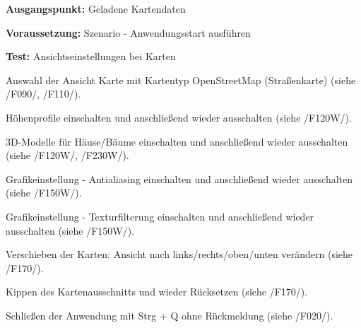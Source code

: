 \documentclass[10pt]{scrreprt}
\newcommand{\sfbf}[1]{\textbf{\sffamily #1}}
\newcommand{\ziel}[1]{{\fontsize{9.5}{11}\textsf{/#1/}}}
\newcommand{\ziellabel}{Z}
\newcommand{\muss}{\renewcommand{\labelenumi}{\textbf{\ziel{\ziellabel\numprint{\theenumi}0}}}}
\newcommand{\wunsch}{\renewcommand{\labelenumi}{\textbf{\ziel{\ziellabel\numprint{\theenumi}0W}}}}
\newenvironment{details}[1][6pt]{%
  \parskip#1 \parindent6mm \raggedright%
  \def\item{\par\ignorespaces\hangindent=5mm \hangafter1}}{%
  \par\ignorespaces}
\begin{document}
\vspace{1.0cm}
\begin{details}[2pt]
\item \sfbf{Ausgangspunkt:} Geladene Kartendaten 
\item \sfbf{Voraussetzung:} Szenario - Anwendungsstart ausführen
\item \sfbf{Test:} Ansichtseinstellungen bei Karten
\end{details}
\begin{enumerate}[leftmargin = 2.2cm, resume]
\item Auswahl der Ansicht Karte mit Kartentyp OpenStreetMap (Straßenkarte) (siehe \ziel{F090}, \ziel{F110}).
\wunsch
\item Höhenprofile einschalten und anschließend wieder ausschalten (siehe \ziel{F120W}).
\item 3D-Modelle für Häuse/Bäume einschalten und anschließend wieder ausschalten (siehe \ziel{F120W}, \ziel{F230W}).
\item Grafikeinstellung - Antialiasing einschalten und anschließend wieder ausschalten (siehe \ziel{F150W}).
\item Grafikeinstellung - Texturfilterung einschalten und anschließend wieder ausschalten (siehe \ziel{F150W}).
\muss
\item Verschieben der Karten: Ansicht nach links/rechts/oben/unten verändern (siehe \ziel{F170}).
\item Kippen des Kartenausschnitts und wieder Rücksetzen (siehe \ziel{F170}).
\item Schließen der Anwendung mit Strg + Q ohne Rückmeldung (siehe \ziel{F020}).
\end{enumerate}
\end{document}
